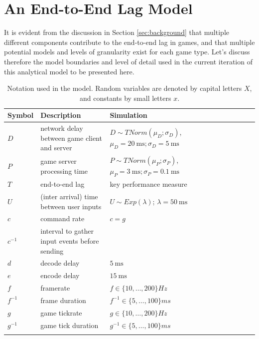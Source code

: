 \section{An End-to-End Lag Model}
\label{sec:model}

It is evident from the discussion in Section \ref{sec:background} 
that multiple different components contribute to 
the end-to-end lag in games, and that multiple potential models and 
levels of granularity exist for each game type.
Let's discuss therefore the model boundaries and level of detail 
used in the current iteration of this analytical model to be presented here.

\newcommand{\maybeaddsomespace}{\\ \addlinespace}
\newcommand{\inv}[1]{#1^{-1}}

\begin{table}[!t]
\caption{Notation used in the model. Random variables are denoted by capital letters $X$, and constants by small letters $x$.}
\label{tab:notation}
\centering
\begin{tabu}{lX[1,l]X[1,l]}
\toprule
Symbol & Description & Simulation \\
\midrule
$D$ & network delay between game client and server & $D \sim TNorm(\mu
_D;\sigma_D)$, $\mu_D=\SI{20}{\milli\second}; \sigma_D=\SI{5}{\milli\second}$\maybeaddsomespace
$P$ & game server processing time & $P \sim TNorm(\mu_P;\sigma_P)$, $ \mu_P=\SI{3}{\milli\second}; \sigma_P=\SI{0.1}{\milli\second}$\maybeaddsomespace
$T$ & end-to-end lag & key performance measure \maybeaddsomespace
$U$ & (inter arrival) time between user inputs & $U \sim Exp(\lambda)$; $\lambda=\SI{50}{\milli\second}$\maybeaddsomespace
\midrule
$c$ & command rate & $c=g$ \\
$\inv{c}$ & interval to gather input events before sending &  \maybeaddsomespace
$d$ & decode delay & $\SI{5}{\milli\second}$ \maybeaddsomespace
$e$ & encode delay & $\SI{15}{\milli\second}$ \maybeaddsomespace
$f$ & framerate & $f \in \{10,\dots,200\} \unit{Hz}$ \\
$\inv{f}$ & frame duration & $\inv{f} \in \{5,\dots,100\} \unit{ms}$ \maybeaddsomespace
$g$ & game tickrate & $g \in \{10,\dots,200\} \unit{Hz}$ \\
$\inv{g}$ & game tick duration & $\inv{g} \in \{5,\dots,100\} \unit{ms}$ \maybeaddsomespace
\bottomrule
\end{tabu}
\end{table}


